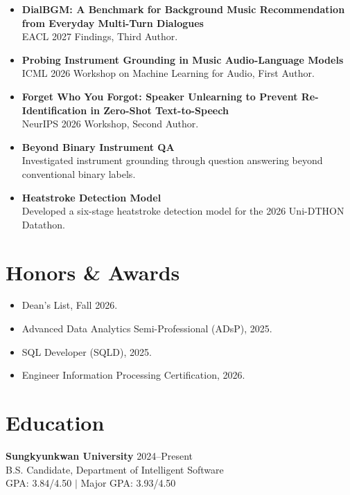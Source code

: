 \documentclass[letterpaper,10pt]{article}
\begin{document}
\begin{itemize}
    \item \textbf{DialBGM: A Benchmark for Background Music Recommendation from Everyday Multi-Turn Dialogues}\\
    EACL 2027 Findings, Third Author.

    \item \textbf{Probing Instrument Grounding in Music Audio-Language Models}\\
    ICML 2026 Workshop on Machine Learning for Audio, First Author.

    \item \textbf{Forget Who You Forgot: Speaker Unlearning to Prevent Re-Identification in Zero-Shot Text-to-Speech}\\
    NeurIPS 2026 Workshop, Second Author.

    \item \textbf{Beyond Binary Instrument QA}\\
    Investigated instrument grounding through question answering beyond conventional binary labels.

    \item \textbf{Heatstroke Detection Model}\\
    Developed a six-stage heatstroke detection model for the 2026 Uni-DTHON Datathon.
\end{itemize}

\section*{Honors \& Awards}

\begin{itemize}
    \item Dean's List, Fall 2026.
    \item Advanced Data Analytics Semi-Professional (ADsP), 2025.
    \item SQL Developer (SQLD), 2025.
    \item Engineer Information Processing Certification, 2026.
\end{itemize}

\section*{Education}

\textbf{Sungkyunkwan University} \hfill 2024--Present\\
B.S. Candidate, Department of Intelligent Software\\
GPA: 3.84/4.50 \quad $|$ \quad Major GPA: 3.93/4.50
\end{document}
